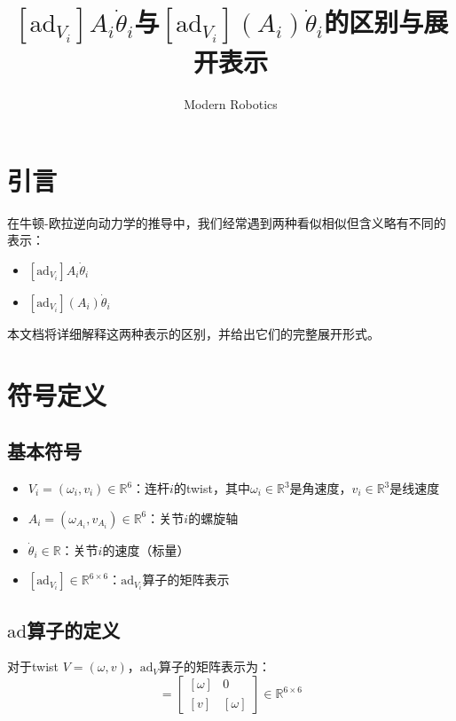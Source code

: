 \documentclass[12pt,a4paper]{article}
\title{$[\text{ad}_{V_i}] A_i \dot{\theta}_i$与$[\text{ad}_{V_i}](A_i) \dot{\theta}_i$的区别与展开表示}
\author{Modern Robotics}
\date{}
\begin{document}
\maketitle

\section{引言}

在牛顿-欧拉逆向动力学的推导中，我们经常遇到两种看似相似但含义略有不同的表示：
\begin{itemize}
\item $[\text{ad}_{V_i}] A_i \dot{\theta}_i$
\item $[\text{ad}_{V_i}](A_i) \dot{\theta}_i$
\end{itemize}

本文档将详细解释这两种表示的区别，并给出它们的完整展开形式。

\section{符号定义}

\subsection{基本符号}

\begin{itemize}
\item $V_i = (\omega_i, v_i) \in \mathbb{R}^6$：连杆$i$的twist，其中$\omega_i \in \mathbb{R}^3$是角速度，$v_i \in \mathbb{R}^3$是线速度
\item $A_i = (\omega_{A_i}, v_{A_i}) \in \mathbb{R}^6$：关节$i$的螺旋轴
\item $\dot{\theta}_i \in \mathbb{R}$：关节$i$的速度（标量）
\item $[\text{ad}_{V_i}] \in \mathbb{R}^{6 \times 6}$：$\text{ad}_{V_i}$算子的矩阵表示
\end{itemize}

\subsection{$\text{ad}$算子的定义}

对于twist $V = (\omega, v)$，$\text{ad}_V$算子的矩阵表示为：
\begin{equation}
[\text{ad}_V] = \begin{bmatrix}
[\omega] & 0 \\
[v] & [\omega]
\end{bmatrix} \in \mathbb{R}^{6 \times 6}
\label{eq:ad_matrix}
\end{equation}
\end{document}
